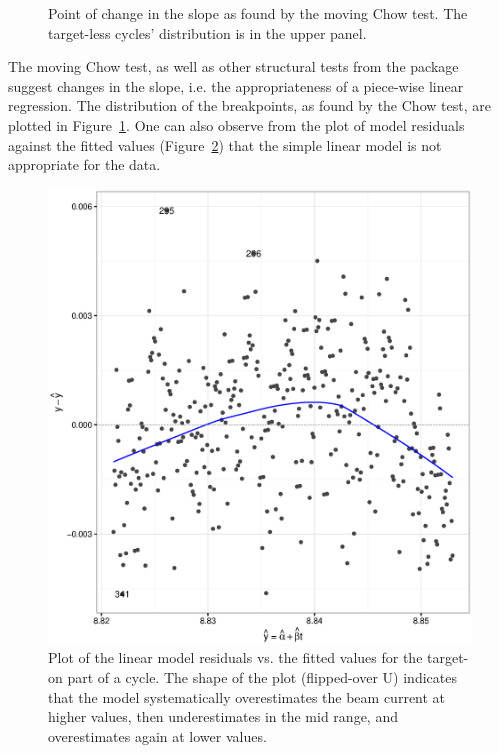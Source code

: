 \documentclass{article}
\begin{document}
\begin{figure}[h]
\begin{minipage}{.5\textwidth}
		\caption{Point of change in the slope as found by the moving Chow test. The target-less cycles' distribution is in the upper panel.\label{FStat_BP_dens}}
	\end{minipage}
\end{figure}

The moving Chow test, as well as other structural tests from the package~\cite{RStrucchange} suggest changes in the slope, i.e. the appropriateness of a piece-wise linear regression. The distribution of the breakpoints, as found by the Chow test, are plotted in Figure~\ref{FStat_BP_dens}. One can also observe from the plot of model residuals against the fitted values (Figure~\ref{fig:RvF-u17}) that the simple linear model is not appropriate for the data.

\begin{figure}[h]
	\centering
	\begin{minipage}[t]{.5\textwidth}
		\centering
			\includegraphics[scale=.5]{Res_VS_Fit_2016-17.eps}
			\caption{Plot of the linear model residuals vs. the fitted values for the target-on part of a cycle. The shape of the plot (flipped-over U) indicates that the model systematically overestimates the beam current at higher values, then underestimates in the mid range, and overestimates again at lower values.\label{fig:RvF-u17}}

\end{minipage}
\end{figure}
\end{document}
